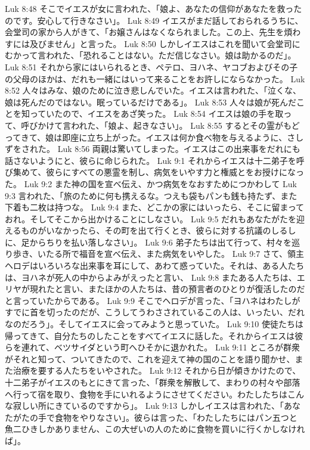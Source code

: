 Luk 8:48  そこでイエスが女に言われた、「娘よ、あなたの信仰があなたを救ったのです。安心して行きなさい」。
Luk 8:49  イエスがまだ話しておられるうちに、会堂司の家から人がきて、「お嬢さんはなくなられました。この上、先生を煩わすには及びません」と言った。
Luk 8:50  しかしイエスはこれを聞いて会堂司にむかって言われた、「恐れることはない。ただ信じなさい。娘は助かるのだ」。
Luk 8:51  それから家にはいられるとき、ペテロ、ヨハネ、ヤコブおよびその子の父母のほかは、だれも一緒にはいって来ることをお許しにならなかった。
Luk 8:52  人々はみな、娘のために泣き悲しんでいた。イエスは言われた、「泣くな、娘は死んだのではない。眠っているだけである」。
Luk 8:53  人々は娘が死んだことを知っていたので、イエスをあざ笑った。
Luk 8:54  イエスは娘の手を取って、呼びかけて言われた、「娘よ、起きなさい」。
Luk 8:55  するとその霊がもどってきて、娘は即座に立ち上がった。イエスは何か食べ物を与えるように、さしずをされた。
Luk 8:56  両親は驚いてしまった。イエスはこの出来事をだれにも話さないようにと、彼らに命じられた。
Luk 9:1  それからイエスは十二弟子を呼び集めて、彼らにすべての悪霊を制し、病気をいやす力と権威とをお授けになった。
Luk 9:2  また神の国を宣べ伝え、かつ病気をなおすためにつかわして
Luk 9:3  言われた、「旅のために何も携えるな。つえも袋もパンも銭も持たず、また下着も二枚は持つな。
Luk 9:4  また、どこかの家にはいったら、そこに留まっておれ。そしてそこから出かけることにしなさい。
Luk 9:5  だれもあなたがたを迎えるものがいなかったら、その町を出て行くとき、彼らに対する抗議のしるしに、足からちりを払い落しなさい」。
Luk 9:6  弟子たちは出て行って、村々を巡り歩き、いたる所で福音を宣べ伝え、また病気をいやした。
Luk 9:7  さて、領主ヘロデはいろいろな出来事を耳にして、あわて惑っていた。それは、ある人たちは、ヨハネが死人の中からよみがえったと言い、
Luk 9:8  またある人たちは、エリヤが現れたと言い、またほかの人たちは、昔の預言者のひとりが復活したのだと言っていたからである。
Luk 9:9  そこでヘロデが言った、「ヨハネはわたしがすでに首を切ったのだが、こうしてうわさされているこの人は、いったい、だれなのだろう」。そしてイエスに会ってみようと思っていた。
Luk 9:10  使徒たちは帰ってきて、自分たちのしたことをすべてイエスに話した。それからイエスは彼らを連れて、ベツサイダという町へひそかに退かれた。
Luk 9:11  ところが群衆がそれと知って、ついてきたので、これを迎えて神の国のことを語り聞かせ、また治療を要する人たちをいやされた。
Luk 9:12  それから日が傾きかけたので、十二弟子がイエスのもとにきて言った、「群衆を解散して、まわりの村々や部落へ行って宿を取り、食物を手にいれるようにさせてください。わたしたちはこんな寂しい所にきているのですから」。
Luk 9:13  しかしイエスは言われた、「あなたがたの手で食物をやりなさい」。彼らは言った、「わたしたちにはパン五つと魚二ひきしかありません、この大ぜいの人のために食物を買いに行くかしなければ」。
